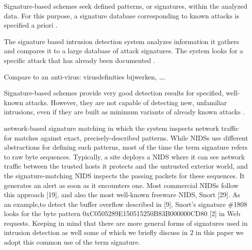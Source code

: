 Signature-based schemes seek defined patterns, or signatures, within the analyzed data. For this purpose, a signature database corresponding to known attacks is specified a priori \citep{CandS}.

The signature based intrusion detection system analyzes information it gathers and compares it to a large database of attack signatures. The system looks for a specific attack that has already been documented \citep{Patent}.

Compare to an anti-virus: virusdefinities bijwerken, \ldots.

Signature-based schemes provide very good detection results for specified, well-known attacks. However, they are not capable of detecting new, unfamiliar intrusions, even if they are built as minimum variants of already known attacks \citep{CandS}.

network-based signature matching in which the system inspects network traffic for matches against exact, precisely-described patterns. While NIDSs use different abstractions for defining such patterns, most of the time the term signature refers to raw byte sequences. Typically, a site deploys a NIDS where it can see network traffic between the trusted hosts it protects and the untrusted exterior world, and the signature-matching NIDS inspects the passing packets for these sequences. It generates an alert as soon as it encounters one. Most commercial NIDSs follow this approach [19], and also the most well-known freeware NIDS, Snort [29]. As an example,to detect the buffer overflow described in [9], Snort’s signature \#1808 looks for the byte pattern 0xC0505289E150515250B83B000000CD80
[2] in Web requests. Keeping in mind that there are more general forms of signatures used in intrusion detection as well some of which we briefly discuss in 2 in this paper we adopt this common use of the term signature.

